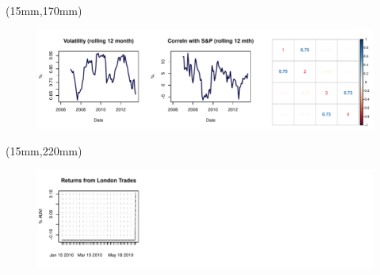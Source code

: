 \documentclass[nohyper,justified]{tufte-handout}\usepackage{graphicx, color}
\makeatletter
\def\maxwidth{ %
  \ifdim\Gin@nat@width>\linewidth
    \linewidth
  \else
    \Gin@nat@width
  \fi
}
\newenvironment{knitrout}{}{} %
\makeatother
\begin{document}
\begin{textblock*}{180mm}(15mm,170mm)
\begin{figure}
\vspace{0pt}
\begin{knitrout}
\color{fgcolor}
\includegraphics[width=\maxwidth]{figure/voletc} 

\end{knitrout}

\end{figure}
\end{textblock*}

\begin{textblock*}{180mm}(15mm,220mm)
\begin{figure}
\vspace{0pt}

\begin{knitrout}
\color{fgcolor}
\includegraphics[width=\maxwidth]{figure/zonertns} 

\end{knitrout}

\end{figure}
\end{textblock*}
\end{document}
